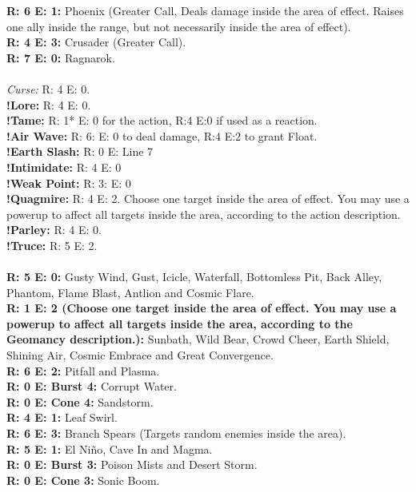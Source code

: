 \textbf{R: 6 E: 1:} Phoenix (Greater Call, Deals damage inside the area of effect. Raises one ally inside the range, but not necessarily inside the area of effect).\\
\textbf{R: 4 E: 3:} Crusader (Greater Call).\\
\textbf{R: 7 E: 0:} Ragnarok.
%
\\\\
%
 \ofrow
\textit{Curse:} R: 4 E: 0.\\
\textbf{!Lore:} R: 4 E: 0.\\
\textbf{!Tame:} R: 1* E: 0 for the action, R:4 E:0 if used as a reaction.\\
\textbf{!Air Wave:} R: 6: E: 0 to deal damage, R:4 E:2 to grant Float.\\
\textbf{!Earth Slash:} R: 0 E: Line 7\\
\textbf{!Intimidate:} R: 4 E: 0\\
\textbf{!Weak Point:} R: 3: E: 0\\
\textbf{!Quagmire:} R: 4 E: 2. Choose one target inside the area of effect. You may use a powerup to affect all targets inside the area, according to the action description.\\
\textbf{!Parley:} R: 4 E: 0. \\
\textbf{!Truce:} R: 5 E: 2.
%
\\\\
%
 \ofrow
\textbf{R: 5 E: 0:} Gusty Wind, Gust, Icicle, Waterfall, Bottomless Pit, Back Alley, Phantom, Flame Blast, Antlion and Cosmic Flare.\\
\textbf{R: 1 E: 2 (Choose one target inside the area of effect. You may use a powerup to affect all targets inside the area, according to the Geomancy description.):}
Sunbath, Wild Bear, Crowd Cheer, Earth Shield, Shining Air, Cosmic Embrace and Great Convergence.\\
\textbf{R: 6 E: 2:} Pitfall and Plasma.\\
\textbf{R: 0 E: Burst 4:} Corrupt Water.\\
\textbf{R: 0 E: Cone 4:} Sandstorm.\\
\textbf{R: 4 E: 1:} Leaf Swirl.\\
\textbf{R: 6 E: 3:} Branch Spears (Targets random enemies inside the area).\\
\textbf{R: 5 E: 1:} El Niño, Cave In and Magma.\\
\textbf{R: 0 E: Burst 3:} Poison Mists and Desert Storm.\\
\textbf{R: 0 E: Cone 3:} Sonic Boom.\\

